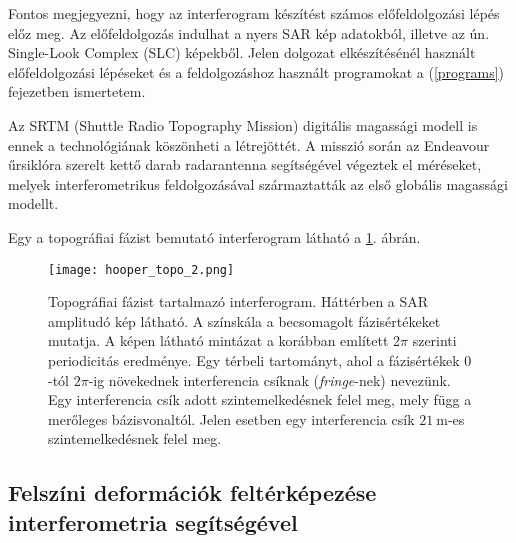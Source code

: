 \documentclass[12pt]{report}
\numberwithin{equation}{section}
\numberwithin{table}{section}
\numberwithin{figure}{section}
\begin{document}
Fontos megjegyezni, hogy az interferogram készítést számos előfeldolgozási lépés előz meg. Az előfeldolgozás indulhat a nyers SAR kép adatokból, illetve az ún. Single-Look Complex (SLC) képekből. Jelen dolgozat elkészítésénél használt előfeldolgozási lépéseket és a feldolgozáshoz használt programokat a (\ref{programs}) fejezetben ismertetem.

Az SRTM (Shuttle Radio Topography Mission) digitális magassági modell \cite{SRTM} is ennek a technológiának köszönheti a létrejöttét. A misszió során az Endeavour űrsiklóra szerelt kettő darab radarantenna segítségével végeztek el méréseket, melyek interferometrikus feldolgozásával származtatták az első globális magassági modellt.

Egy a topográfiai fázist bemutató interferogram látható a \ref{insar_topo}. ábrán.

\begin{center}
    \begin{figure}[H]
        \centering
        \texttt{[image: hooper\_topo\_2.png]}
        \caption{Topográfiai fázist tartalmazó interferogram. Háttérben a SAR amplitudó kép látható. A színskála a becsomagolt fázisértékeket mutatja. A képen látható mintázat a korábban említett $2\pi$ szerinti periodicitás eredménye. Egy térbeli tartományt, ahol a fázisértékek $0$-tól $2\pi$-ig növekednek interferencia csíknak (\textit{fringe}-nek) nevezünk. Egy interferencia csík adott szintemelkedésnek felel meg, mely függ a merőleges bázisvonaltól. Jelen esetben egy interferencia csík $\SI{21}{\meter}$-es szintemelkedésnek felel meg. \cite{HooperThesis}}\label{insar_topo}
    \end{figure}
\end{center}

\subsection{Felszíni deformációk feltérképezése interferometria segítségével}
\end{document}
